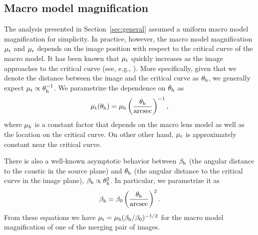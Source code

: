 \documentclass[showpacs,twocolumn,preprintnumbers,amsmath,amssymb,superscriptaddress,nofootinbib]{revtex4}
\begin{document}
\subsection{Macro model magnification}
\label{sec:macromodel}

The analysis presented in Section~\ref{sec:general} assumed a uniform
macro model magnification for simplicity. In practice, however, the
macro model magnification $\mu_{\rm t}$ and $\mu_{\rm r}$ depends on
the image position with respect to the critical curve of the macro
model. It has been known that $\mu_{\rm t}$ quickly increases as the
image approaches to the critical curve (see, e.g.,
\cite{Blandford:1986zz,Schneider:1992aa}). More specifically, given
that we denote the distance between the image and the critical curve
as $\theta_{\rm h}$, we generally expect $\mu_{\rm t}\propto
\theta_{\rm h}^{-1}$. We parametrize the dependence on $\theta_{\rm h}$
 as 
\begin{equation}
  \mu_{\rm t}(\theta_{\rm h})=\mu_{\rm h}\left(\frac{\theta_{\rm
      h}}{\rm arcsec}\right)^{-1},
\label{eq:mu_th}
\end{equation}
where $\mu_{\rm h}$ is a constant factor that depends on the macro
lens model as well as the location on the critical curve. On other
other hand, $\mu_{\rm r}$ is approximately constant near the critical
curve. 

There is also a well-known asymptotic behavior between $\beta_{\rm h}$
(the angular distance to the caustic in the source plane) and 
$\theta_{\rm h}$ (the angular distance to the critical curve in the
image plane), $\beta_{\rm h}\propto \theta_{\rm h}^2$. In particular,
we parametrize it as
\begin{equation}
  \beta_{\rm h}=\beta_0\left(\frac{\theta_{\rm h}}{\rm
    arcsec}\right)^2.
  \label{eq:mu_beta}
\end{equation}
From these equations we have $\mu_{\rm t}=\mu_{\rm h}(\beta_{\rm
  h}/\beta_0)^{-1/2}$ for the macro model magnification of one of the
merging pair of images.
\end{document}
